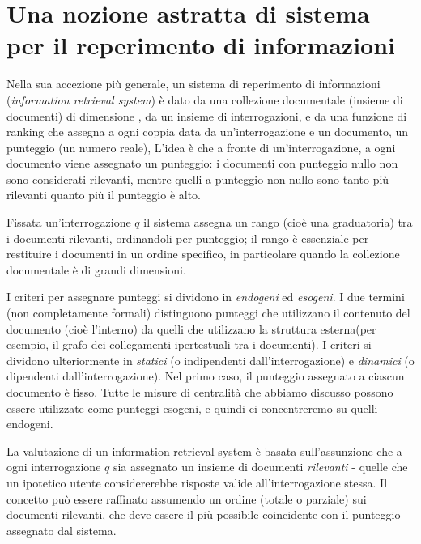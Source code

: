\section{Una nozione astratta di sistema per il reperimento di informazioni}
Nella sua accezione più generale, un sistema di reperimento di informazioni (\textit{information retrieval system}) è dato da una collezione documentale  (insieme di documenti) di dimensione , da un insieme  di interrogazioni, e da una funzione di ranking  che assegna a ogni coppia data da un'interrogazione e un documento, un punteggio (un numero reale), L'idea è che a fronte di un'interrogazione, a ogni documento viene assegnato un punteggio: i documenti con punteggio nullo non sono considerati rilevanti, mentre quelli a punteggio non nullo sono tanto più rilevanti quanto più il punteggio è alto.

Fissata un'interrogazione $q$ il sistema assegna un rango (cioè una graduatoria) tra i documenti rilevanti, ordinandoli per punteggio; il rango è essenziale per restituire i documenti in un ordine specifico, in particolare quando la collezione documentale è di grandi dimensioni.

I criteri per assegnare punteggi si dividono in \textit{endogeni} ed \textit{esogeni}. I due termini (non completamente formali) distinguono punteggi che utilizzano il contenuto del documento (cioè l'interno) da quelli che utilizzano la struttura esterna(per esempio, il grafo dei collegamenti ipertestuali tra i documenti). I criteri si dividono ulteriormente in \textit{statici} (o indipendenti dall'interrogazione) e \textit{dinamici} (o dipendenti dall'interrogazione). Nel primo caso, il punteggio assegnato a ciascun documento è fisso. Tutte le misure di centralità che abbiamo discusso possono essere utilizzate come punteggi esogeni, e quindi ci concentreremo su quelli endogeni.

La valutazione di un information retrieval system è basata sull'assunzione che a ogni interrogazione $q$ sia assegnato un insieme di documenti \textit{rilevanti} - quelle che un ipotetico utente considererebbe risposte valide all'interrogazione stessa. Il concetto può essere raffinato assumendo un ordine (totale o parziale) sui documenti rilevanti, che deve essere il più possibile coincidente con il punteggio assegnato dal sistema.

